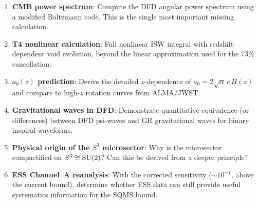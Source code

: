 \documentclass[11pt]{article}
\newcommand{\aM}{a_0}
\begin{document}
\begin{enumerate}
\item \textbf{CMB power spectrum}: Compute the DFD angular power
  spectrum using a modified Boltzmann code. This is the single most
  important missing calculation.

\item \textbf{T4 nonlinear calculation}: Full nonlinear ISW integral
  with redshift-dependent void evolution, beyond the linear
  approximation used for the $73\%$ cancellation.

\item \textbf{$\aM(z)$ prediction}: Derive the detailed $z$-dependence
  of $\aM = 2\sqrt{\alpha}\,c\,H(z)$ and compare to high-$z$ rotation
  curves from ALMA/JWST.

\item \textbf{Gravitational waves in DFD}: Demonstrate quantitative
  equivalence (or differences) between DFD psi-waves and GR
  gravitational waves for binary inspiral waveforms.

\item \textbf{Physical origin of the $S^3$ microsector}: Why is the
  microsector compactified on $S^3 \cong {\rm SU}(2)$? Can this be
  derived from a deeper principle?

\item \textbf{ESS Channel~A reanalysis}: With the corrected sensitivity
  ($\sim 10^{-7}$, above the current bound), determine whether ESS
  data can still provide useful systematics information for the SQMS
  bound.
\end{enumerate}
\end{document}
